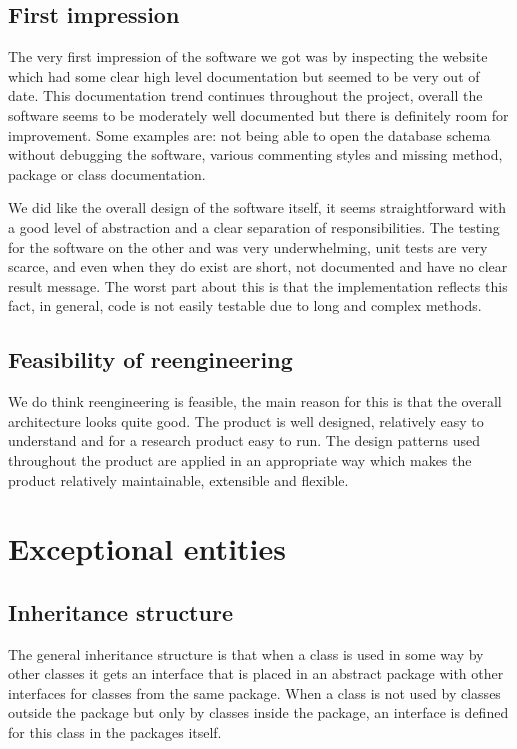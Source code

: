 \documentclass[a4paper,11pt,titlepage]{article}
\begin{document}
\subsection{First impression}
The very first impression of the software we got was by inspecting the website which had some clear high level documentation but seemed to be very out of date. This documentation trend continues throughout the project, overall the software seems to be moderately well documented but there is definitely room for improvement. Some examples are: not being able to open the database schema without debugging the software, various commenting styles and missing method, package or class documentation. 

We did like the overall design of the software itself, it seems straightforward with a good level of abstraction and a clear separation of responsibilities. The testing for the software on the other and was very underwhelming, unit tests are very scarce, and even when they do exist are short, not documented and have no clear result message. The worst part about this is that the implementation reflects this fact, in general, code is not easily testable due to long and complex methods.

\subsection{Feasibility of reengineering}
We do think reengineering is feasible, the main reason for this is that the overall architecture looks quite good. The product is well designed, relatively easy to understand and for a research product easy to run. The design patterns used throughout the product are applied in an appropriate way which makes the product relatively maintainable, extensible and flexible.

\section{Exceptional entities}
\subsection{Inheritance structure}
The general inheritance structure is that when a class is used in some way by other classes it gets an interface that is placed in an abstract package with other interfaces for classes from the same package. When a class is not used by classes outside the package but only by classes inside the package, an interface is defined for this class in the packages itself.
\end{document}

